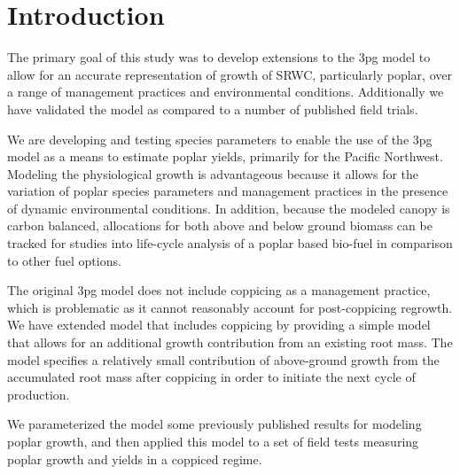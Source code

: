 \documentclass[10pt]{article}
\begin{document}

\section*{Introduction}

The primary goal of this study was to develop extensions to the
\ac{3pg} model to allow for an accurate representation of growth of
\ac{SRWC}, particularly poplar, over a range of management practices
and environmental conditions.  Additionally we have validated the
model as compared to a number of published field trials.

We are developing and testing species parameters to enable the use of
the \acf{3pg} model as a means to estimate poplar yields, primarily
for the Pacific Northwest.  Modeling the physiological growth is
advantageous because it allows for the variation of poplar species
parameters and management practices in the presence of dynamic
environmental conditions.  In addition, because the modeled canopy is
carbon balanced, allocations for both above and below ground biomass
can be tracked for studies into life-cycle analysis of a poplar based
bio-fuel in comparison to other fuel options.

The original \ac{3pg} model does not include coppicing as a management
practice, which is problematic as it cannot reasonably account for
post-coppicing regrowth.  We have extended model that includes
coppicing by providing a simple model that allows for an additional
growth contribution from an existing root mass.  The model specifies a
relatively small contribution of above-ground growth from the
accumulated root mass after coppicing in order to initiate the next
cycle of production.

We parameterized the model some previously published results for
modeling poplar growth, and then applied this model to a set of field
tests measuring poplar growth and yields in a coppiced regime.

\newcommand{\pop}{\textit{Populus} }
\end{document}
